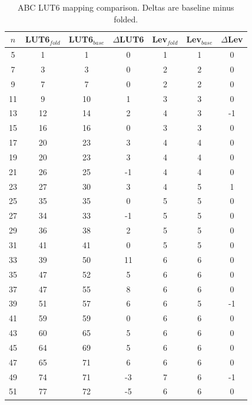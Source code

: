 \begin{table}[t]
\centering
\caption{ABC LUT6 mapping comparison. Deltas are baseline minus folded.}
\label{tab:lut6_map}
\begin{tabular}{ccccccc}
\hline
$n$ & LUT6$_{fold}$ & LUT6$_{base}$ & $\Delta$LUT6 & Lev$_{fold}$ & Lev$_{base}$ & $\Delta$Lev \\
\hline
5 & 1 & 1 & 0 & 1 & 1 & 0 \\
7 & 3 & 3 & 0 & 2 & 2 & 0 \\
9 & 7 & 7 & 0 & 2 & 2 & 0 \\
11 & 9 & 10 & 1 & 3 & 3 & 0 \\
13 & 12 & 14 & 2 & 4 & 3 & -1 \\
15 & 16 & 16 & 0 & 3 & 3 & 0 \\
17 & 20 & 23 & 3 & 4 & 4 & 0 \\
19 & 20 & 23 & 3 & 4 & 4 & 0 \\
21 & 26 & 25 & -1 & 4 & 4 & 0 \\
23 & 27 & 30 & 3 & 4 & 5 & 1 \\
25 & 35 & 35 & 0 & 5 & 5 & 0 \\
27 & 34 & 33 & -1 & 5 & 5 & 0 \\
29 & 36 & 38 & 2 & 5 & 5 & 0 \\
31 & 41 & 41 & 0 & 5 & 5 & 0 \\
33 & 39 & 50 & 11 & 6 & 6 & 0 \\
35 & 47 & 52 & 5 & 6 & 6 & 0 \\
37 & 47 & 55 & 8 & 6 & 6 & 0 \\
39 & 51 & 57 & 6 & 6 & 5 & -1 \\
41 & 59 & 59 & 0 & 6 & 6 & 0 \\
43 & 60 & 65 & 5 & 6 & 6 & 0 \\
45 & 64 & 69 & 5 & 6 & 6 & 0 \\
47 & 65 & 71 & 6 & 6 & 6 & 0 \\
49 & 74 & 71 & -3 & 7 & 6 & -1 \\
51 & 77 & 72 & -5 & 6 & 6 & 0 \\
\hline
\end{tabular}
\end{table}
